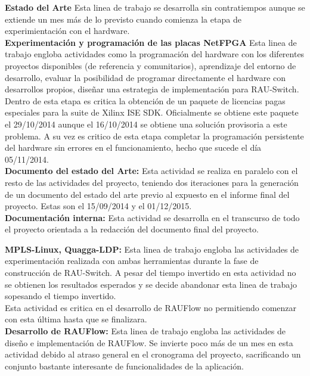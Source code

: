 \textbf{Estado del Arte} Esta linea de trabajo se desarrolla sin contratiempos aunque se extiende un mes m\'as de lo previsto cuando comienza la etapa de experimientaci\'on con el hardware.\\ 
  
\textbf{Experimentaci\'on y programaci\'on de las placas NetFPGA} Esta linea de trabajo engloba actividades como la programaci\'on del hardware con los diferentes proyectos disponibles (de referencia y comunitarios), aprendizaje del entorno de desarrollo, evaluar la posibilidad de programar directamente el hardware con desarrollos propios, diseñar una estrategia de implementaci\'on para RAU-Switch.\\

Dentro de esta etapa es critica la obtenci\'on de un paquete de licencias pagas especiales para la suite de Xilinx ISE SDK. Oficialmente se obtiene este paquete el 29/10/2014 aunque el 16/10/2014 se obtiene una soluci\'on provisoria a este problema. A su vez es critico de esta etapa completar la programaci\'on persistente del hardware sin errores en el funcionamiento, hecho que sucede el día 05/11/2014.\\

\textbf{Documento del estado del Arte:} Esta actividad se realiza en paralelo con el resto de las actividades del proyecto, teniendo dos iteraciones para la generación de un documento del estado del arte previo al expuesto en el informe final del proyecto. Estas son el 15/09/2014 y el 01/12/2015.\\

\textbf{Documentación interna:} Esta actividad se desarrolla en el transcurso de todo el proyecto orientada a la redacci\'on del documento final del proyecto.

\textbf{MPLS-Linux, Quagga-LDP:} Esta linea de trabajo engloba las actividades de experimentaci\'on realizada con ambas herramientas durante la fase de construcci\'on de RAU-Switch. A pesar del tiempo invertido en esta actividad no se obtienen los resultados esperados y se decide abandonar esta linea de trabajo sopesando el tiempo invertido.\\

Esta actividad es critica en el desarrollo de RAUFlow no permitiendo comenzar con esta \'ultima hasta que se finalizara.\\

\textbf{Desarrollo de RAUFlow:} Esta linea de trabajo engloba las actividades de diseño e implementaci\'on de RAUFlow. Se invierte poco m\'as de un mes en esta actividad debido al atraso general en el cronograma del proyecto, sacrificando un conjunto bastante interesante de funcionalidades de la aplicaci\'on.

